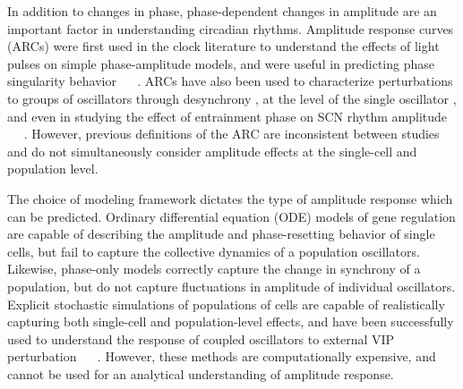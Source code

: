 \documentclass[11pt, letterpaper]{article}
\providecommand{\DIFadd}[1]{{\protect\color{blue}#1}} %
\providecommand{\DIFdel}[1]{{\protect\color{red}}}                      %
\providecommand{\DIFaddbegin}{} %
\providecommand{\DIFaddend}{} %
\providecommand{\DIFdelbegin}{} %
\providecommand{\DIFdelend}{} %
\begin{document}
\DIFdelend In addition to changes in phase\DIFdelbegin \DIFdel{or period}\DIFdelend , phase-dependent changes in amplitude are \DIFdelbegin \DIFdel{frequently considered in both experimental and computational studies and
are an important tool }\DIFdelend \DIFaddbegin \DIFadd{an important factor }\DIFaddend in understanding circadian rhythms.
Amplitude response curves (ARCs) were first used in \DIFdelbegin \DIFdel{circadian rhythms }\DIFdelend \DIFaddbegin \DIFadd{the clock literature }\DIFaddend to understand the effects of light pulses on simple phase-amplitude models, and were useful in predicting phase singularity behavior \DIFdelbegin \DIFdel{, or drastic reductions in amplitude
\mbox{%
\cite{Jewett1998}
}%
.
Amplitude response curves }\DIFdelend \DIFaddbegin \DIFadd{\mbox{%
\cite{Jewett1998}
}%
.
ARCs }\DIFaddend have also been used to characterize perturbations to groups of oscillators through desynchrony \cite{Achermann1999, Ukai2007}, \DIFdelbegin \DIFdel{or }\DIFdelend at the level of the single oscillator \cite{VanderVeen2012, Castejon2013}\DIFaddbegin \DIFadd{, and even in studying the effect of entrainment phase on SCN rhythm amplitude \mbox{%
\cite{VanOosterhout2012}
}%
}\DIFaddend .
However, \DIFdelbegin \DIFdel{there is a lack of consistency
between amplitude definitions, and previous methods }\DIFdelend \DIFaddbegin \DIFadd{previous definitions of the ARC are inconsistent between studies and }\DIFaddend do not simultaneously consider amplitude effects at the \DIFdelbegin \DIFdel{single cell }\DIFdelend \DIFaddbegin \DIFadd{single-cell }\DIFaddend and population level.

\DIFaddbegin \DIFadd{The choice of modeling framework dictates the type of amplitude response which can be predicted.
Ordinary differential equation (ODE) models of gene regulation are capable of describing the amplitude and phase-resetting behavior of single cells, but fail to capture the collective dynamics of a population oscillators.
Likewise, phase-only models correctly capture the change in synchrony of a population, but do not capture fluctuations in amplitude of individual oscillators.
Explicit stochastic simulations of populations of cells are capable of realistically capturing both single-cell and population-level effects, and have been successfully used to understand the response of coupled oscillators to external VIP perturbation \mbox{%
\cite{An2013}
}%
.
However, these methods are computationally expensive, and cannot be used for an analytical understanding of amplitude response.
}
\end{document}
